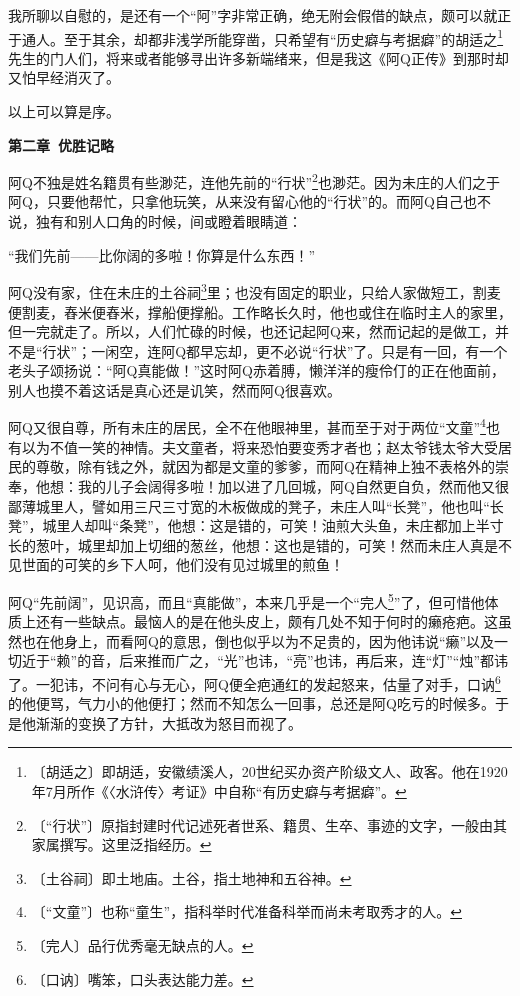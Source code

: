 \documentclass[12pt,UTF-8,openany]{ctexbook}
\begin{document}
\begin{large}
    我所聊以自慰的，是还有一个“阿”字非常正确，绝无附会假借的缺点，颇可以就正于通人。至于其余，却都非浅学所能穿凿，只希望有“历史癖与考据癖”的胡适之\footnote{〔胡适之〕即胡适，安徽绩溪人，20世纪买办资产阶级文人、政客。他在1920年7月所作《〈水浒传〉考证》中自称“有历史癖与考据癖”。}先生的门人们，将来或者能够寻出许多新端绪来，但是我这《阿Q正传》到那时却又怕早经消灭了。
    
    以上可以算是序。
    
    \begin{center}\textbf{第二章~优胜记略}\end{center}
    
    阿Q不独是姓名籍贯有些渺茫，连他先前的“行状”\footnote{〔“行状”〕原指封建时代记述死者世系、籍贯、生卒、事迹的文字，一般由其家属撰写。这里泛指经历。}也渺茫。因为未庄的人们之于阿Q，只要他帮忙，只拿他玩笑，从来没有留心他的“行状”的。而阿Q自己也不说，独有和别人口角的时候，间或瞪着眼睛道：
    
    “我们先前——比你阔的多啦！你算是什么东西！”
    
    阿Q没有家，住在未庄的土谷祠\footnote{〔土谷祠〕即土地庙。土谷，指土地神和五谷神。}里；也没有固定的职业，只给人家做短工，割麦便割麦，舂米便舂米，撑船便撑船。工作略长久时，他也或住在临时主人的家里，但一完就走了。所以，人们忙碌的时候，也还记起阿Q来，然而记起的是做工，并不是“行状”；一闲空，连阿Q都早忘却，更不必说“行状”了。只是有一回，有一个老头子颂扬说：“阿Q真能做！”这时阿Q赤着膊，懒洋洋的瘦伶仃的正在他面前，别人也摸不着这话是真心还是讥笑，然而阿Q很喜欢。
    
    阿Q又很自尊，所有未庄的居民，全不在他眼神里，甚而至于对于两位“文童”\footnote{〔“文童”〕也称“童生”，指科举时代准备科举而尚未考取秀才的人。}也有以为不值一笑的神情。夫文童者，将来恐怕要变秀才者也；赵太爷钱太爷大受居民的尊敬，除有钱之外，就因为都是文童的爹爹，而阿Q在精神上独不表格外的崇奉，他想：我的儿子会阔得多啦！加以进了几回城，阿Q自然更自负，然而他又很鄙薄城里人，譬如用三尺三寸宽的木板做成的凳子，未庄人叫“长凳”，他也叫“长凳”，城里人却叫“条凳”，他想：这是错的，可笑！油煎大头鱼，未庄都加上半寸长的葱叶，城里却加上切细的葱丝，他想：这也是错的，可笑！然而未庄人真是不见世面的可笑的乡下人呵，他们没有见过城里的煎鱼！
    
    阿Q“先前阔”，见识高，而且“真能做”，本来几乎是一个“完人\footnote{〔完人〕品行优秀毫无缺点的人。}”了，但可惜他体质上还有一些缺点。最恼人的是在他头皮上，颇有几处不知于何时的癞疮疤。这虽然也在他身上，而看阿Q的意思，倒也似乎以为不足贵的，因为他讳说“癞”以及一切近于“赖”的音，后来推而广之，“光”也讳，“亮”也讳，再后来，连“灯”“烛”都讳了。一犯讳，不问有心与无心，阿Q便全疤通红的发起怒来，估量了对手，口讷\footnote{〔口讷〕嘴笨，口头表达能力差。}的他便骂，气力小的他便打；然而不知怎么一回事，总还是阿Q吃亏的时候多。于是他渐渐的变换了方针，大抵改为怒目而视了。
    

\end{large}
\end{document}
